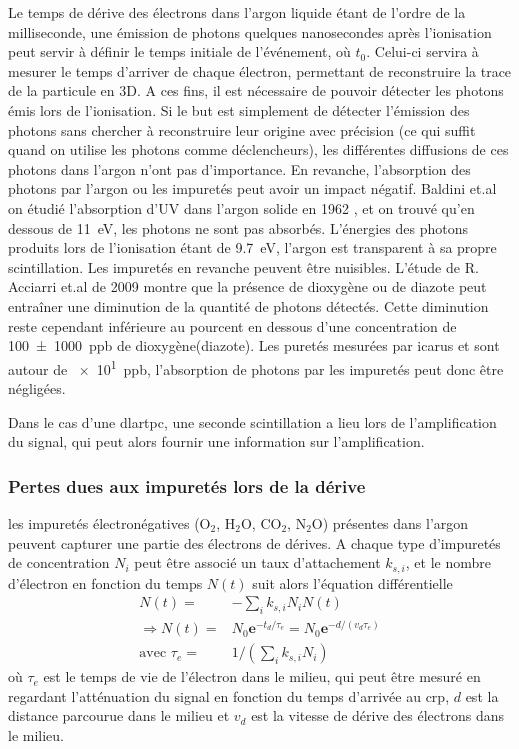         Le temps de dérive des électrons dans l'argon liquide étant de l'ordre de la milliseconde, une émission de photons quelques nanosecondes après l'ionisation peut servir à définir le temps initiale de l'événement, où $t_0$. Celui-ci servira à mesurer le temps d'arriver de chaque électron, permettant de reconstruire la trace de la particule en 3D. A ces fins, il est nécessaire de pouvoir détecter les photons émis lors de l'ionisation. Si le but est simplement de détecter l'émission des photons sans chercher à reconstruire leur origine avec précision (ce qui suffit quand on utilise les photons comme déclencheurs), les différentes diffusions de ces photons dans l'argon n'ont pas d'importance. En revanche, l'absorption des photons par l'argon ou les impuretés peut avoir un impact négatif. Baldini et.al on étudié l'absorption d'UV dans l'argon solide en 1962 \cite{Baldini1962}, et on trouvé qu'en dessous de \SI{11}{\eV}, les photons ne sont pas absorbés. L'énergies des photons produits lors de l'ionisation étant de \SI{9.7}{\eV}, l'argon est transparent à sa propre scintillation. Les impuretés en revanche peuvent être nuisibles. L'étude de R. Acciarri et.al de 2009\cite{Acciarri2009} montre que la présence de dioxygène ou de diazote peut entraîner une diminution de la quantité de photons détectés. Cette diminution reste cependant inférieure au pourcent en dessous d'une concentration de \SI{100(1000)}{ppb} de dioxygène(diazote). Les puretés mesurées par \gls{icarus}\cite{Antonello2014} et \protosp{} sont autour de \SI{e1}{ppb}, l'absorption de photons par les impuretés peut donc être négligées.

        Dans le cas d'une \gls{dlartpc}, une seconde scintillation a lieu lors de l'amplification du signal, qui peut alors fournir une information sur l'amplification.

      \subsubsection{Pertes dues aux impuretés lors de la dérive}
        
        les impuretés électronégatives (O$_2$, H$_2$O, CO$_2$, N$_2$O) présentes dans l'argon peuvent capturer une partie des électrons de dérives. A chaque type d'impuretés de concentration $N_i$ peut être associé un taux d'attachement $k_{s,i}$, et le nombre d'électron en fonction du temps $N(t)$ suit alors l'équation différentielle\cite{Buckley1989}
        \begin{eqnarray}
          N(t) = & -\sum_{i} k_{s,i}N_i N(t)\\
          \Rightarrow N(t) = & N_0\textbf{e}^{-t_d/\tau_e}=N_0\textbf{e}^{-d/(v_d\tau_e)}\label{eq::losses} \\
          \text{avec } \tau_e = & 1/(\sum_{i} k_{s,i}N_i)
        \end{eqnarray}
        où $\tau_e$ est le temps de vie de l'électron dans le milieu, qui peut être mesuré en regardant l'atténuation du signal en fonction du temps d'arrivée au \gls{crp}, $d$ est la distance parcourue dans le milieu et $v_d$ est la vitesse de dérive des électrons dans le milieu.

